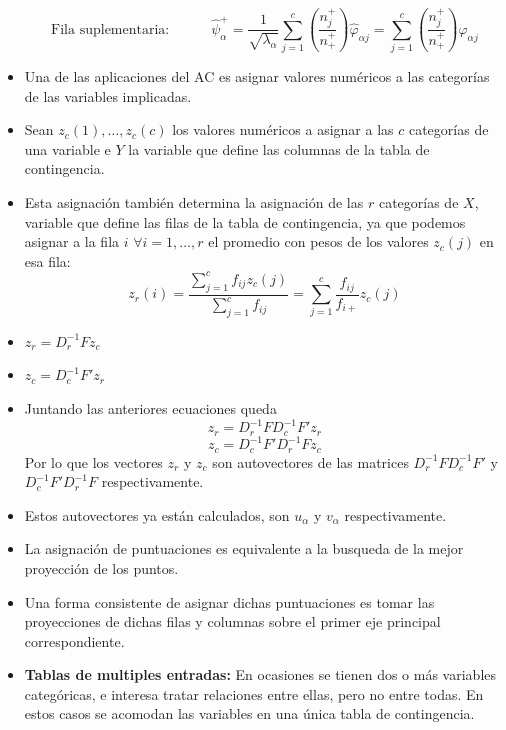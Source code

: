 \begin{itemize}
\[    \]
    \[
        \text{Fila suplementaria:} \qquad\quad \hat{\psi}^{+}_\alpha=\frac{1}{\sqrt{\lambda_\alpha}}\sum_{j=1}^c\left(\frac{n^{+}_j}{n^{+}_{+}}\right)\hat{\varphi}_{\alpha j}=\sum_{j=1}^c\left(\frac{n^{+}_{j}}{n^{+}_{+}}\right)\varphi_{\alpha j}
    \]
    \item Una de las aplicaciones del AC es asignar valores numéricos a las categorías de las variables implicadas.
    \item Sean $z_c(1),\dots,z_c(c)$ los valores numéricos a asignar a las $c$ categorías de una variable e $Y$ la variable que define las columnas de la tabla de contingencia.
    \item Esta asignación también determina la asignación de las $r$ categorías de $X$, variable que define las filas de la tabla de contingencia, ya que podemos asignar a la fila $i$ $\forall i=1,\dots,r$ el promedio con pesos de los valores $z_c(j)$ en esa fila:
    \[
        z_r(i)=\frac{\sum_{j=1}^c f_{ij}z_c(j)}{\sum_{j=1}^c f_{ij}}=\sum_{j=1}^c \frac{f_{ij}}{f_{i+}}z_c(j)
    \]
    \newpage
    \item $z_r=D^{-1}_rFz_c$
    \item $z_c=D^{-1}_cF'z_r$
    \item Juntando las anteriores ecuaciones queda
    \[
        z_r=D^{-1}_rFD^{-1}_cF'z_r
    \]
    \[
        z_c=D^{-1}_cF'D^{-1}_rFz_c
    \]
    Por lo que los vectores $z_r$ y $z_c$ son autovectores de las matrices $D^{-1}_rFD^{-1}_cF'$ y $D^{-1}_cF'D^{-1}_rF$ respectivamente.
    \item Estos autovectores ya están calculados, son $u_\alpha$ y $v_\alpha$ respectivamente.
    \item La asignación de puntuaciones es equivalente a la busqueda de la mejor proyección de los puntos.
    \item Una forma consistente de asignar dichas puntuaciones es tomar las proyecciones de dichas filas y columnas sobre el primer eje principal correspondiente.
    \item \textbf{Tablas de multiples entradas: } En ocasiones se tienen dos o más variables categóricas, e interesa tratar relaciones entre ellas, pero no entre todas. En estos casos se acomodan las variables en una única tabla de contingencia.
    
    \vspace*{2mm}


\end{itemize}
